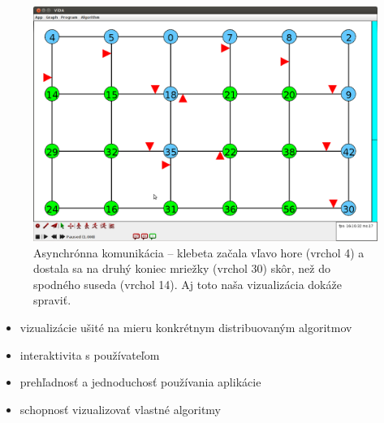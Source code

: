 \begin{figure}
\includegraphics[width=\columnwidth]{asyn}
\vspace{-1cm}
\caption{Asynchrónna komunikácia -- klebeta začala vľavo hore (vrchol 4) a dostala sa na druhý
koniec mriežky (vrchol 30) skôr, než do spodného suseda (vrchol 14). Aj toto naša vizualizácia
dokáže spraviť. }
\end{figure}

\begin{itemize}
    \item vizualizácie ušité na mieru konkrétnym distribuovaným algoritmov
    \item interaktivita s používateľom
    \item prehľadnosť a jednoduchosť používania aplikácie
    \item schopnosť vizualizovať vlastné algoritmy
\end{itemize}
\vspace{-0.5cm}
